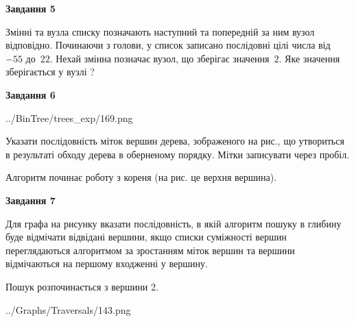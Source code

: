 \documentclass[12pt, ukrainian]{article}
\begin{document}
{\begin {large}
{\begin {center}\textbf{Завдання 5}\end {center}}\par
Змінні  та  вузла списку позначають наступний та попередній за ним вузол відповідно. Починаючи з голови, у список записано послідовні цілі числа від~$-55$ до~$22$. Нехай змінна  позначає вузол, що зберігає значення~$2$.
Яке значення зберігається у вузлі  ?\par
\newpage

{\begin {center}\textbf{Завдання 6}\end {center}}\par

\begin{center}
	{../BinTree/trees_exp/169.png}
\end{center}
Указати послідовність міток вершин дерева, зображеного на рис., що утвориться в результаті обходу дерева в оберненому порядку. Мітки записувати через пробіл.\par Алгоритм починає роботу з кореня (на рис. це верхня вершина).\par
\newpage

{\begin {center}\textbf{Завдання 7}\end {center}}\par
Для графа на рисунку вказати послідовність, в якій алгоритм пошуку в глибину буде відмічати відвідані вершини, якщо списки суміжності вершин переглядаються алгоритмом за зростанням міток вершин та вершини відмічаються на першому вход\-женні у вершину.\par
Пошук розпочинається з вершини 2.\par

\begin{center}
	{../Graphs/Traversals/143.png}
\end{center}\par
\newpage


\end{large}}
\end{document}
